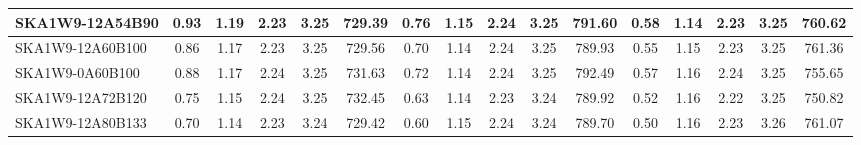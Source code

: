 \begin{table}[H]
{{\begin{tabular}{|lccccc||ccccc||ccccc|}
SKA1W9-12A54B90 & 0.93 \cellcolor{blue!60.00} & 1.19 \cellcolor{red!51.44} & 2.23 \cellcolor{green!18.00} & 3.25 \cellcolor{orange!52.61} & 729.39 \cellcolor{purple!18.00} & 0.76 \cellcolor{blue!60.00} & 1.15 \cellcolor{red!25.19} & 2.24 \cellcolor{green!33.21} & 3.25 \cellcolor{orange!49.22} & 791.60 \cellcolor{purple!46.54} & 0.58 \cellcolor{blue!60.00} & 1.14 \cellcolor{red!18.00} & 2.23 \cellcolor{green!29.22} & 3.25 \cellcolor{orange!32.51} & 760.62 \cellcolor{purple!57.06}\\ \hline 
SKA1W9-12A60B100 & 0.86 \cellcolor{blue!46.93} & 1.17 \cellcolor{red!31.82} & 2.23 \cellcolor{green!20.80} & 3.25 \cellcolor{orange!43.73} & 729.56 \cellcolor{purple!18.87} & 0.70 \cellcolor{blue!45.59} & 1.14 \cellcolor{red!20.53} & 2.24 \cellcolor{green!52.40} & 3.25 \cellcolor{orange!60.00} & 789.93 \cellcolor{purple!21.43} & 0.55 \cellcolor{blue!48.79} & 1.15 \cellcolor{red!30.69} & 2.23 \cellcolor{green!41.30} & 3.25 \cellcolor{orange!18.00} & 761.36 \cellcolor{purple!60.00}\\ \hline 
SKA1W9-0A60B100 & 0.88 \cellcolor{blue!49.93} & 1.17 \cellcolor{red!32.02} & 2.24 \cellcolor{green!60.00} & 3.25 \cellcolor{orange!42.25} & 731.63 \cellcolor{purple!29.55} & 0.72 \cellcolor{blue!49.45} & 1.14 \cellcolor{red!19.72} & 2.24 \cellcolor{green!39.00} & 3.25 \cellcolor{orange!57.40} & 792.49 \cellcolor{purple!60.00} & 0.57 \cellcolor{blue!54.64} & 1.16 \cellcolor{red!36.03} & 2.24 \cellcolor{green!60.00} & 3.25 \cellcolor{orange!28.95} & 755.65 \cellcolor{purple!37.24}\\ \hline 
SKA1W9-12A72B120 & 0.75 \cellcolor{blue!28.19} & 1.15 \cellcolor{red!20.36} & 2.24 \cellcolor{green!50.67} & 3.25 \cellcolor{orange!48.17} & 732.45 \cellcolor{purple!33.81} & 0.63 \cellcolor{blue!25.59} & 1.14 \cellcolor{red!18.00} & 2.23 \cellcolor{green!18.00} & 3.24 \cellcolor{orange!18.00} & 789.92 \cellcolor{purple!21.29} & 0.52 \cellcolor{blue!29.87} & 1.16 \cellcolor{red!41.14} & 2.22 \cellcolor{green!18.00} & 3.25 \cellcolor{orange!28.95} & 750.82 \cellcolor{purple!18.00}\\ \hline 
SKA1W9-12A80B133 & 0.70 \cellcolor{blue!18.00} & 1.14 \cellcolor{red!18.00} & 2.23 \cellcolor{green!38.53} & 3.24 \cellcolor{orange!18.00} & 729.42 \cellcolor{purple!18.11} & 0.60 \cellcolor{blue!18.20} & 1.15 \cellcolor{red!27.89} & 2.24 \cellcolor{green!32.84} & 3.24 \cellcolor{orange!26.92} & 789.70 \cellcolor{purple!18.00} & 0.50 \cellcolor{blue!18.00} & 1.16 \cellcolor{red!45.53} & 2.23 \cellcolor{green!24.33} & 3.26 \cellcolor{orange!60.00} & 761.07 \cellcolor{purple!58.84}\\ \hline 

\end{tabular}}}
\end{table}
